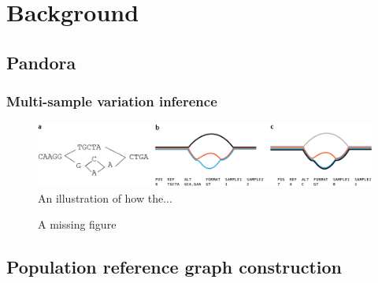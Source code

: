 \chapter{Background}


\section{Pandora}
\label{sec:pandora-intro}
\cite{rachelthesis}

\subsection{Multi-sample variation inference}
\label{sec:pandora-compare}


\begin{figure}
\begin{center}
\includegraphics[width=0.95\columnwidth]{Chapter0/Figs/variant_representation.png}
\caption{{An illustration of how the...
{\label{fig:var-representation}}
}}
\end{center}
\end{figure}

\begin{figure}
\centering
{}
\caption{A missing figure}
\label{fig:reference-bias}
\end{figure}

\section{Population reference graph construction}
\label{sec:make_prg}

